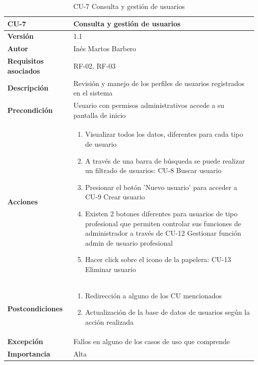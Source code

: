 \begin{table}[p]
	\centering
	\begin{tabularx}{\linewidth}{ p{} p{} }
		\toprule
		\textbf{CU-7}    & \textbf{Consulta y gestión de usuarios}\\
		\toprule
		\textbf{Versión}              & 1.1    \\
		\textbf{Autor}                & Inés Martos Barbero \\
		\textbf{Requisitos asociados} & RF-02, RF-03 \\
		\textbf{Descripción}          & Revisión y manejo de los perfiles de usuarios registrados en el sistema \\
		\textbf{Precondición}         & Usuario con permisos administrativos accede a su pantalla de inicio \\
		\textbf{Acciones}             &
		\begin{enumerate}
			\def\labelenumi{\arabic{enumi}.}
			\tightlist
			\item Visualizar todos los datos, diferentes para cada tipo de usuario
			\item A través de una barra de búsqueda se puede realizar un filtrado de usuarios: CU-8 Buscar usuario
            \item Presionar el botón 'Nuevo usuario' para acceder a CU-9 Crear usuario
            \item Existen 2 botones diferentes para usuarios de tipo profesional que permiten controlar sus funciones de administrador a través de CU-12 Gestionar función admin de usuario profesional
            \item Hacer click sobre el icono de la papelera: CU-13 Eliminar usuario
		\end{enumerate}\\
        \textbf{Postcondiciones}         & 
            \begin{enumerate}
			\def\labelenumi{\arabic{enumi}.}
			\tightlist
			\item Redirección a alguno de los CU mencionados
			\item Actualización de la base de datos de usuarios según la acción realizada
		\end{enumerate}\\
		\textbf{Excepción}          & Fallos en alguno de los casos de uso que comprende \\
		\textbf{Importancia}          & Alta \\
		\bottomrule
	\end{tabularx}
	\caption{CU-7 Consulta y gestión de usuarios}
    \label{CU-7}
\end{table}

